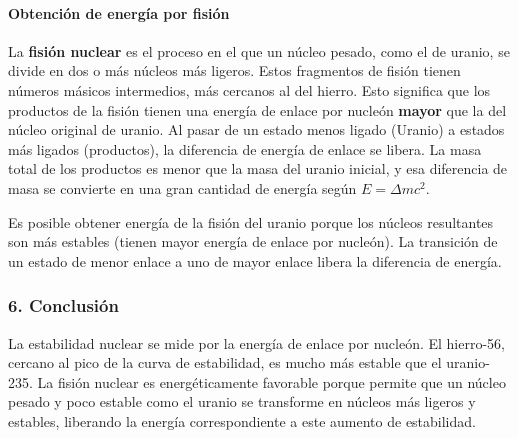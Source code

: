 \paragraph{Obtención de energía por fisión}
La \textbf{fisión nuclear} es el proceso en el que un núcleo pesado, como el de uranio, se divide en dos o más núcleos más ligeros. Estos fragmentos de fisión tienen números másicos intermedios, más cercanos al del hierro.
Esto significa que los productos de la fisión tienen una energía de enlace por nucleón \textbf{mayor} que la del núcleo original de uranio. Al pasar de un estado menos ligado (Uranio) a estados más ligados (productos), la diferencia de energía de enlace se libera. La masa total de los productos es menor que la masa del uranio inicial, y esa diferencia de masa se convierte en una gran cantidad de energía según $E=\Delta m c^2$.

\begin{cajaresultado}
Es posible obtener energía de la fisión del uranio porque los núcleos resultantes son más estables (tienen mayor energía de enlace por nucleón). La transición de un estado de menor enlace a uno de mayor enlace libera la diferencia de energía.
\end{cajaresultado}

\subsubsection*{6. Conclusión}
\begin{cajaconclusion}
La estabilidad nuclear se mide por la energía de enlace por nucleón. El hierro-56, cercano al pico de la curva de estabilidad, es mucho más estable que el uranio-235. La fisión nuclear es energéticamente favorable porque permite que un núcleo pesado y poco estable como el uranio se transforme en núcleos más ligeros y estables, liberando la energía correspondiente a este aumento de estabilidad.
\end{cajaconclusion}

\newpage